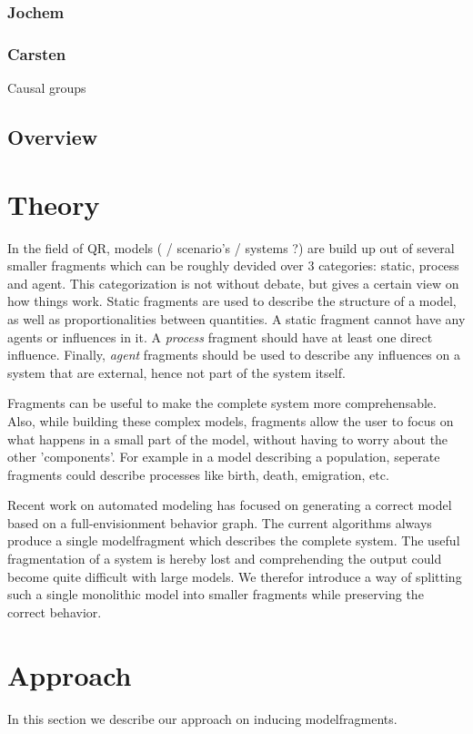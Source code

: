 \documentclass{article}
\begin{document}
\subsubsection{Jochem}


\subsubsection{Carsten}
Causal groups

\subsection{Overview}


\section{Theory}
In the field of QR, models ( / scenario's / systems ?) are build up out of several smaller fragments which can be roughly devided over 3 categories: static, process and agent. This categorization is not without debate, but gives a certain view on how things work. Static fragments are used to describe the structure of a model, as well as proportionalities between quantities. A static fragment cannot have any agents or influences in it. A \emph{process} fragment should have at least one direct influence. Finally, \emph{agent} fragments should be used to describe any influences on a system that are external, hence not part of the system itself.

Fragments can be useful to make the complete system more comprehensable. Also, while building these complex models, fragments allow the user to focus on what happens in a small part of the model, without having to worry about the other 'components'. For example in a model describing a population, seperate fragments could describe processes like birth, death, emigration, etc.

Recent work on automated modeling \cite{buisman, vanweelden, liem} has focused on generating a correct model based on a full-envisionment behavior graph. The current algorithms always produce a single modelfragment which describes the complete system. The useful fragmentation of a system is hereby lost and comprehending the output could become quite difficult with large models. We therefor introduce a way of splitting such a single monolithic model into smaller fragments while preserving the correct behavior.

\section{Approach}
In this section we describe our approach on inducing modelfragments.
\end{document}
